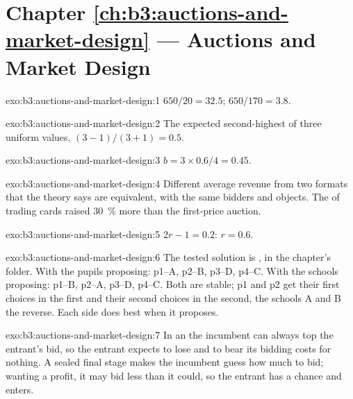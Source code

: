 \section*{Chapter \ref{ch:b3:auctions-and-market-design} --- Auctions and Market Design}

\begin{solution}{exo:b3:auctions-and-market-design:1}
$650/20 = 32.5$; $650/170 = 3.8$. %
\end{solution}

\begin{solution}{exo:b3:auctions-and-market-design:2}
The expected second-highest of three uniform values, $(3 - 1)/(3 + 1) = 0.5$.
\end{solution}

\begin{solution}{exo:b3:auctions-and-market-design:3}
$b = 3 \times 0.6/4 = 0.45$.
\end{solution}

\begin{solution}{exo:b3:auctions-and-market-design:4}
Different average revenue from two formats that the theory says are equivalent, with
the same bidders and objects. The  of trading cards raised 30~\% more than
the first-price auction.
\end{solution}

\begin{solution}{exo:b3:auctions-and-market-design:5}
$2r - 1 = 0.2$: $r = 0.6$.
\end{solution}

\begin{solution}{exo:b3:auctions-and-market-design:6}
The tested solution is , in the chapter's 
folder. With the pupils proposing: p1--A, p2--B, p3--D, p4--C. With the schools proposing: p1--B,
p2--A, p3--D, p4--C. Both are stable; p1 and p2 get their first choices in the first and their
second choices in the second, the schools A and B the reverse. Each side does best
when it proposes. %
\end{solution}

\begin{solution}{exo:b3:auctions-and-market-design:7}
In an  the incumbent can always top the entrant's bid, so the entrant
expects to lose and to bear its bidding costs for nothing. A sealed final stage makes
the incumbent guess how much to bid; wanting a profit, it may bid less than it
could, so the entrant has a chance and enters.
\end{solution}

